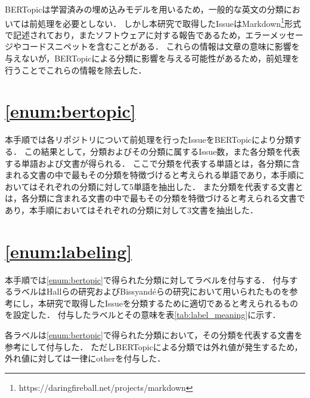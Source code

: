 \documentclass[main]{subfiles}
\begin{document}
BERTopicは学習済みの埋め込みモデルを用いるため，一般的な英文の分類においては前処理を必要としない．
しかし本研究で取得したIssueはMarkdown\footnote{https://daringfireball.net/projects/markdown}形式で記述されており，またソフトウェアに対する報告であるため，エラーメッセージやコードスニペットを含むことがある．
これらの情報は文章の意味に影響を与えないが，BERTopicによる分類に影響を与える可能性があるため，前処理を行うことでこれらの情報を除去した．


\section{\ref{enum:bertopic}}
\label{sec:bertopic}

本手順では各リポジトリについて前処理を行ったIssueをBERTopicにより分類する．
この結果として，分類およびその分類に属するIssue数，また各分類を代表する単語および文書が得られる．
ここで分類を代表する単語とは，各分類に含まれる文書の中で最もその分類を特徴づけると考えられる単語であり，本手順においてはそれぞれの分類に対して5単語を抽出した．
また分類を代表する文書とは，各分類に含まれる文書の中で最もその分類を特徴づけると考えられる文書であり，本手順においてはそれぞれの分類に対して3文書を抽出した．


\section{\ref{enum:labeling}}
\label{sec:labeling}

本手順では\ref{enum:bertopic}で得られた分類に対してラベルを付与する．
付与するラベルはHallらの研究\cite{hall:2001}およびBissyand{\'e}らの研究\cite{bissyande:2013}において用いられたものを参考にし，本研究で取得したIssueを分類するために適切であると考えられるものを設定した．
付与したラベルとその意味を表\ref{tab:label_meaning}に示す．



各ラベルは\ref{enum:bertopic}で得られた分類において，その分類を代表する文書を参考にして付与した．
ただしBERTopicによる分類では外れ値が発生するため，外れ値に対しては一律にotherを付与した．
\end{document}
